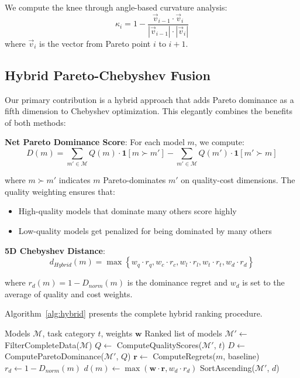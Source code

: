 \documentclass[11pt,a4paper]{article}
\begin{document}
We compute the knee through angle-based curvature analysis:
\begin{equation}
\kappa_i = 1 - \frac{\vec{v}_{i-1} \cdot \vec{v}_i}{|\vec{v}_{i-1}| \cdot |\vec{v}_i|}
\end{equation}
where $\vec{v}_i$ is the vector from Pareto point $i$ to $i+1$.

\subsection{Hybrid Pareto-Chebyshev Fusion}

Our primary contribution is a hybrid approach that adds Pareto dominance as a fifth dimension to Chebyshev optimization. This elegantly combines the benefits of both methods:

\textbf{Net Pareto Dominance Score}: For each model $m$, we compute:
\begin{equation}
D(m) = \sum_{m' \in \mathcal{M}} Q(m) \cdot \mathbf{1}[m \succ m'] - \sum_{m' \in \mathcal{M}} Q(m') \cdot \mathbf{1}[m' \succ m]
\end{equation}

where $m \succ m'$ indicates $m$ Pareto-dominates $m'$ on quality-cost dimensions. The quality weighting ensures that:
\begin{itemize}
    \item High-quality models that dominate many others score highly
    \item Low-quality models get penalized for being dominated by many others
\end{itemize}

\textbf{5D Chebyshev Distance}:
\begin{equation}
d_{Hybrid}(m) = \max\left\{ w_q \cdot r_q, w_c \cdot r_c, w_l \cdot r_l, w_t \cdot r_t, w_d \cdot r_d \right\}
\end{equation}

where $r_d(m) = 1 - D_{norm}(m)$ is the dominance regret and $w_d$ is set to the average of quality and cost weights.

Algorithm~\ref{alg:hybrid} presents the complete hybrid ranking procedure.

\begin{algorithm}[h]
\caption{Hybrid Pareto-Chebyshev Ranking}
\label{alg:hybrid}
\begin{algorithmic}[1]
\Require Models $\mathcal{M}$, task category $t$, weights $\mathbf{w}$
\Ensure Ranked list of models
\State $\mathcal{M}' \gets$ FilterCompleteData($\mathcal{M}$)
\State $Q \gets$ ComputeQualityScores($\mathcal{M}'$, $t$)
\State $D \gets$ ComputeParetoDominance($\mathcal{M}'$, $Q$)
    \State $\mathbf{r} \gets$ ComputeRegrets($m$, baseline)
    \State $r_d \gets 1 - D_{norm}(m)$
    \State $d(m) \gets \max(\mathbf{w} \cdot \mathbf{r}, w_d \cdot r_d)$
\EndFor
\State \Return SortAscending($\mathcal{M}'$, $d$)
\end{algorithmic}
\end{algorithm}
\end{document}
